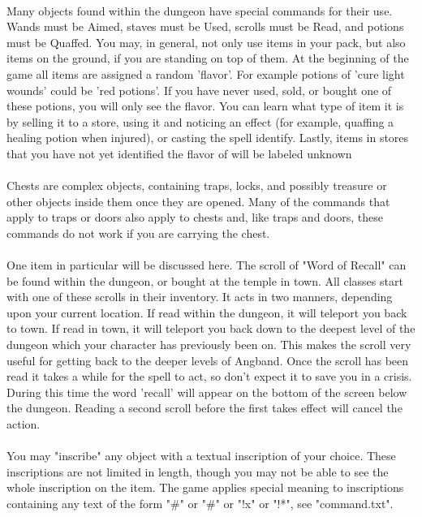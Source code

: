 \paragraph{}Many objects found within the dungeon have special commands for their use.
Wands must be Aimed, staves must be Used, scrolls must be Read, and potions
must be Quaffed. You may, in general, not only use items in your pack, but
also items on the ground, if you are standing on top of them. At the
beginning of the game all items are assigned a random 'flavor'. For example
potions of 'cure light wounds' could be 'red potions'. If you have never
used, sold, or bought one of these potions, you will only see the flavor.
You can learn what type of item it is by selling it to a store, using it and
noticing an effect (for example, quaffing a healing potion when injured), or
casting the spell identify. Lastly, items in stores that you have not
yet identified the flavor of will be labeled {unknown}

\paragraph{}Chests are complex objects, containing traps, locks, and possibly treasure
or other objects inside them once they are opened. Many of the commands
that apply to traps or doors also apply to chests and, like traps and doors,
these commands do not work if you are carrying the chest.

\paragraph{}One item in particular will be discussed here. The scroll of "Word of
Recall" can be found within the dungeon, or bought at the temple in town.
All classes start with one of these scrolls in their inventory.
It acts in two manners, depending upon your current location. If read
within the dungeon, it will teleport you back to town. If read in town, it
will teleport you back down to the deepest level of the dungeon which your
character has previously been on. This makes the scroll very useful for
getting back to the deeper levels of Angband. Once the scroll has been
read it takes a while for the spell to act, so don't expect it to save you
in a crisis. During this time the word 'recall' will appear on the bottom
of the screen below the dungeon. Reading a second scroll before the first
takes effect will cancel the action.

\paragraph{}You may "inscribe" any object with a textual inscription of your choice.
These inscriptions are not limited in length, though you may not be able to
see the whole inscription on the item. The game applies special meaning to
inscriptions containing any text of the form "\@\#" or "\@x\#" or "!x" or "!*",
see "command.txt".

